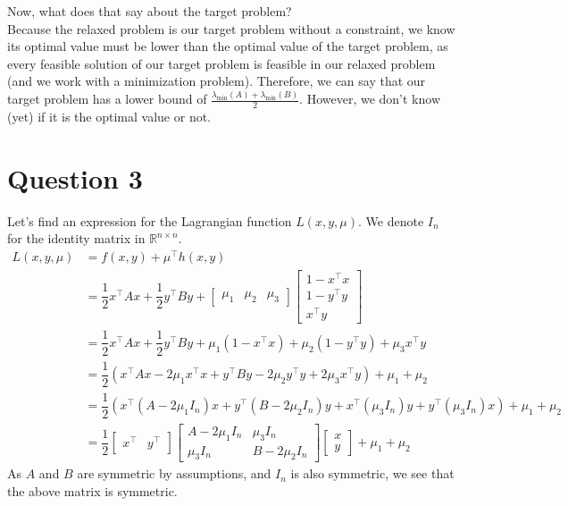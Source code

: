 \documentclass{article}
\newcommand{\R}{\mathbb{R}}
\newcommand{\tp}{^\top}
\newcommand{\fxy}{\dfrac{1}{2}x\tp A x + \dfrac{1}{2} y\tp B y}
\newcommand{\hxy}{\begin{bmatrix}
1-x\tp x\\
1-y\tp y\\
x\tp y
\end{bmatrix}}
\begin{document}
Now, what does that say about the target problem?\\
Because the relaxed problem is our target problem without a constraint, we know its optimal value must be lower than the optimal value of the target problem, as every feasible solution of our target problem is feasible in our relaxed problem (and we work with a minimization problem). Therefore, we can say that our target problem has a lower bound of $\frac{\lambda_{\min} (A)+\lambda_{\min} (B)}{2}$. However, we don't know (yet) if it is the optimal value or not.

\section*{Question 3}
Let's find an expression for the Lagrangian function $L(x,y,\mu)$. We denote $I_n$ for the identity matrix in $\R^{n\times n}$.
\begin{align*}
L(x,y,\mu) &= f(x,y)+\mu\tp h(x,y) \\
&=\fxy  + \begin{bmatrix} \mu_1 &\mu_2 & \mu_3 \end{bmatrix} \hxy \\
&=\fxy + \mu_1(1-x\tp x) +\mu_2(1-y\tp y) + \mu_3 x\tp y \\
&= \dfrac{1}{2}\left(x\tp A x - 2\mu_1 x\tp x +  y\tp B y -2\mu_2 y\tp y + 2\mu_3 x\tp y\right) + \mu_1+\mu_2 \\
&= \dfrac{1}{2} \left(x\tp  \left( A - 2\mu_1 I_n \right) x +  y\tp \left( B -2\mu_2 I_n \right) y   + x\tp  \left( \mu_3 I_n \right) y+ y\tp \left( \mu_3 I_n \right) x \right) + \mu_1+\mu_2 \\
&= \dfrac{1}{2} \begin{bmatrix} x\tp & y\tp\end{bmatrix}
\begin{bmatrix} A-2\mu_1 I_n & \mu_3 I_n \\
\mu_3 I_n & B-2\mu_2 I_n \end{bmatrix}
\begin{bmatrix} x \\ y \end{bmatrix} +\mu_1+\mu_2 
\end{align*}
As $A$ and $B$ are symmetric by assumptions, and $I_n$ is also symmetric, we see that the above matrix is symmetric.
\end{document}
